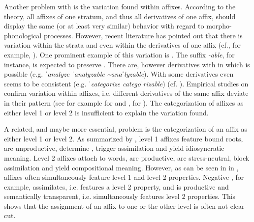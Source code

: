 Another problem with  is the variation found within affixes. According to the theory, all affixes of one stratum, and thus all derivatives of one affix, should display the same (or at least very similar) behavior with regard to morpho-phonological processes. However, recent literature has pointed out that there is variation within the strata and even within the derivatives of one affix (cf., for example, \citealt{Raffelsiefen.1999,Bauer.2013, Plag.2014, BermudezOtero.2017}).  One prominent example of this variation is . The suffix \textit{-able}, for instance, is expected to preserve . There are, however derivatives with  in which  is possible (e.g. \textit{ˈanalyze \textendash ˈanalyzable \textasciitilde anaˈlyzable}). With some derivatives  even seems to  be consistent (e.g. \textit{ˈcategorize \textendash categoˈrizable}) (cf. \citealt[213 f.]{Plag.2014}). Empirical studies on  confirm variation within affixes, i.e. different derivatives of the same affix deviate in their  pattern (see for example \citealt{Collie.2008} for  and , \citealt{Sanz.2017} for ). The categorization of affixes as either level 1 or level 2 is insufficient to explain the variation found. 

A related, and maybe more essential, problem is the categorization of an affix as either level 1 or level 2. As summarized by \citet[134]{Raffelsiefen.1999}, level 1 affixes feature bound roots, are unproductive, determine , trigger assimilation and yield idiosyncratic meaning. Level 2 affixes attach to words, are productive, are stress-neutral, block assimilation and yield compositional meaning. However, as can be seen in  in , affixes often simultaneously feature level 1 and level 2 properties. Negative , for example, assimilates, i.e. features a level 2 property, and is productive and semantically transparent, i.e. simultaneously features level 2 properties. This shows that the assignment of an affix to one or the other level is often not clear-cut. 

